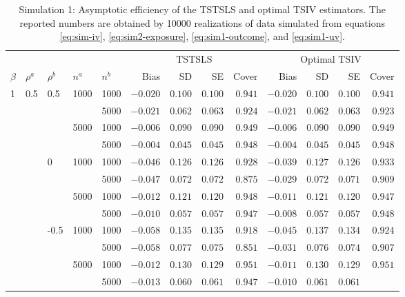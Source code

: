 \documentclass[preprint]{imsart}
\begin{document}
\renewcommand{\arraystretch}{1.25}
\begin{table}[t]
  \centering
  \caption{Simulation 1: Asymptotic efficiency of the TSTSLS and optimal TSIV
    estimators. The reported numbers are obtained by 10000 realizations
    of data simulated from equations \eqref{eq:sim-iv},
    \eqref{eq:sim2-exposure}, \eqref{eq:sim1-outcome}, and
    \eqref{eq:sim1-uv}.}
  \label{tab:sim1}
  \begin{tabular}{|lllll|rrrr|rrrr|}
    \hline
    & & & & & \multicolumn{4}{c|}{TSTSLS} &
    \multicolumn{4}{c|}{Optimal TSIV} \\
    $\beta$ & $\rho^a$ & $\rho^b$ & $n^a$ & $n^b$ & Bias & SD & SE & Cover &
    Bias & SD & SE & Cover \\
    \hline
    1 & 0.5 & 0.5 & 1000 & 1000  & $-0.020$ & $0.100$ & $0.100$ & $0.941$ & $-0.020$ & $0.100$ & $0.100$ & $0.941$ \\
    &  &  &  & 5000  & $-0.021$ & $0.062$ & $0.063$ & $0.924$ & $-0.021$ & $0.062$ & $0.063$ & $0.923$ \\
    &  &  & 5000 & 1000  & $-0.006$ & $0.090$ & $0.090$ & $0.949$ & $-0.006$ & $0.090$ & $0.090$ & $0.949$ \\
    &  &  &  & 5000  & $-0.004$ & $0.045$ & $0.045$ & $0.948$ & $-0.004$ & $0.045$ & $0.045$ & $0.948$ \\
    &  & 0 & 1000 & 1000  & $-0.046$ & $0.126$ & $0.126$ & $0.928$ & $-0.039$ & $0.127$ & $0.126$ & $0.933$ \\
    &  &  &  & 5000  & $-0.047$ & $0.072$ & $0.072$ & $0.875$ & $-0.029$ & $0.072$ & $0.071$ & $0.909$ \\
    &  &  & 5000 & 1000  & $-0.012$ & $0.121$ & $0.120$ & $0.948$ & $-0.011$ & $0.121$ & $0.120$ & $0.947$ \\
    &  &  &  & 5000  & $-0.010$ & $0.057$ & $0.057$ & $0.947$ & $-0.008$ & $0.057$ & $0.057$ & $0.948$ \\
    &  & -0.5 & 1000 & 1000  & $-0.058$ & $0.135$ & $0.135$ & $0.918$ & $-0.045$ & $0.137$ & $0.134$ & $0.924$ \\
    &  &  &  & 5000  & $-0.058$ & $0.077$ & $0.075$ & $0.851$ & $-0.031$ & $0.076$ & $0.074$ & $0.907$ \\
    &  &  & 5000 & 1000  & $-0.012$ & $0.130$ & $0.129$ & $0.951$ & $-0.011$ & $0.130$ & $0.129$ & $0.951$ \\
    &  &  &  & 5000  & $-0.013$ & $0.060$ & $0.061$ & $0.947$ & $-0.010$
    & $0.061$ & $0.061$ &

\end{tabular}
\end{table}
\end{document}
